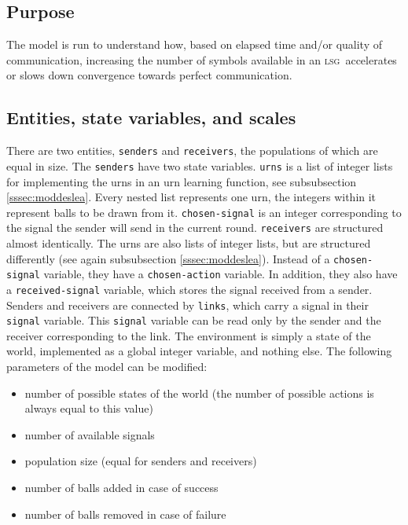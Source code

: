 \documentclass[DIV=calc,BCOR=0mm,pagesize]{scrartcl}
\newcommand{\code}[1]{\texttt{#1}}
\newcommand{\lsg}{\textsc{lsg}}
\begin{document}
\subsection{Purpose}
\label{ssec:modpur}
The model is run to understand how, based on elapsed time and/or quality of communication, increasing the number of symbols available in an \lsg\ accelerates or slows down convergence towards perfect communication.

\subsection{Entities, state variables, and scales}
\label{ssec:modent}
There are two entities, \code{senders} and \code{receivers}, the populations of which are equal in size.
The \code{senders} have two state variables.
\code{urns} is a list of integer lists for implementing the urns in an urn learning function, see subsubsection \ref{sssec:moddeslea}.
Every nested list represents one urn, the integers within it represent balls to be drawn from it.
\code{chosen-signal} is an integer corresponding to the signal the sender will send in the current round.
\code{receivers} are structured almost identically.
The urns are also lists of integer lists, but are structured differently (see again subsubsection \ref{sssec:moddeslea}).
Instead of a \code{chosen-signal} variable, they have a \code{chosen-action} variable.
In addition, they also have a \code{received-signal} variable, which stores the signal received from a sender.
Senders and receivers are connected by \code{links}, which carry a signal in their \code{signal} variable.
This \code{signal} variable can be read only by the sender and the receiver corresponding to the link.
The environment is simply a state of the world, implemented as a global integer variable, and nothing else.
The following parameters of the model can be modified:
\begin{itemize}
	\item number of possible states of the world (the number of possible actions is always equal to this value)
	\item number of available signals
	\item population size (equal for senders and receivers)
	\item number of balls added in case of success
	\item number of balls removed in case of failure
\end{itemize}
\end{document}
